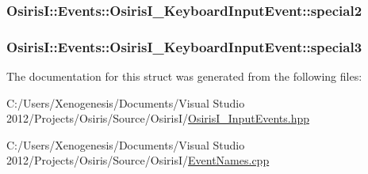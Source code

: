 \hypertarget{struct_osiris_i_1_1_events_1_1_osiris_i___keyboard_input_event_a7127dfdb264bf84beeda9309b17de587}{
\subsubsection[{special2}]{ Osiris\-I\-::\-Events\-::\-Osiris\-I\-\_\-\-Keyboard\-Input\-Event\-::special2\hspace{0.3cm}{\ttfamily [protected]}}}\label{struct_osiris_i_1_1_events_1_1_osiris_i___keyboard_input_event_a7127dfdb264bf84beeda9309b17de587}
\hypertarget{struct_osiris_i_1_1_events_1_1_osiris_i___keyboard_input_event_ad9943b19700d470d1c8d06a38fbc5de0}{
\subsubsection[{special3}]{ Osiris\-I\-::\-Events\-::\-Osiris\-I\-\_\-\-Keyboard\-Input\-Event\-::special3\hspace{0.3cm}{\ttfamily [protected]}}}\label{struct_osiris_i_1_1_events_1_1_osiris_i___keyboard_input_event_ad9943b19700d470d1c8d06a38fbc5de0}


The documentation for this struct was generated from the following files\-:\begin{DoxyCompactItemize}
\item 
C\-:/\-Users/\-Xenogenesis/\-Documents/\-Visual Studio 2012/\-Projects/\-Osiris/\-Source/\-Osiris\-I/\hyperlink{_osiris_i___input_events_8hpp}{Osiris\-I\-\_\-\-Input\-Events.\-hpp}\item 
C\-:/\-Users/\-Xenogenesis/\-Documents/\-Visual Studio 2012/\-Projects/\-Osiris/\-Source/\-Osiris\-I/\hyperlink{_event_names_8cpp}{Event\-Names.\-cpp}\end{DoxyCompactItemize}
